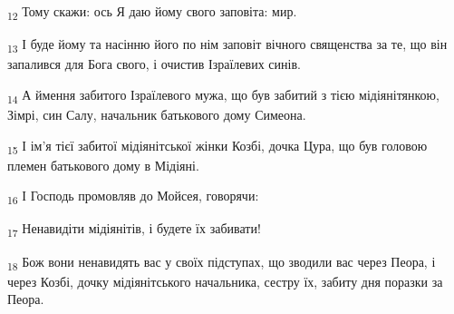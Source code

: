 \begin{tcolorbox}
\textsubscript{12} Тому скажи: ось Я даю йому свого заповіта: мир.
\end{tcolorbox}
\begin{tcolorbox}
\textsubscript{13} І буде йому та насінню його по нім заповіт вічного священства за те, що він запалився для Бога свого, і очистив Ізраїлевих синів.
\end{tcolorbox}
\begin{tcolorbox}
\textsubscript{14} А ймення забитого Ізраїлевого мужа, що був забитий з тією мідіянітянкою, Зімрі, син Салу, начальник батькового дому Симеона.
\end{tcolorbox}
\begin{tcolorbox}
\textsubscript{15} І ім'я тієї забитої мідіянітської жінки Козбі, дочка Цура, що був головою племен батькового дому в Мідіяні.
\end{tcolorbox}
\begin{tcolorbox}
\textsubscript{16} І Господь промовляв до Мойсея, говорячи:
\end{tcolorbox}
\begin{tcolorbox}
\textsubscript{17} Ненавидіти мідіянітів, і будете їх забивати!
\end{tcolorbox}
\begin{tcolorbox}
\textsubscript{18} Бож вони ненавидять вас у своїх підступах, що зводили вас через Пеора, і через Козбі, дочку мідіянітського начальника, сестру їх, забиту дня поразки за Пеора.
\end{tcolorbox}
